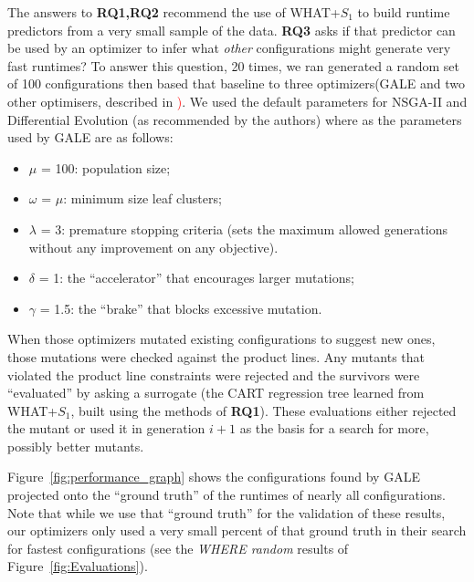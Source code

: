 \documentclass{sig-alternative}
\newcommand{\fig}[1]{Figure~\ref{fig:#1}}
\begin{document}
The answers to {\bf RQ1,RQ2} recommend the use of WHAT+$S_1$ to build runtime predictors from a very small sample
of the data. {\bf RQ3}
asks if that predictor can be used by an optimizer to infer what {\em other} configurations might generate very fast runtimes?
To answer this question, 20 times, we ran generated a random set of 100 configurations then based that baseline to three optimizers(GALE and two other optimisers,  described in \textcolor{red}{)}.
We used the default parameters for NSGA-II and Differential Evolution (as recommended by the authors) where as the parameters used by GALE are as follows:
\begin{itemize}
\item $\mu$ = 100: population size;
\item $\omega$ = $\mu$: minimum size leaf clusters;
\item $\lambda$ = 3: premature stopping criteria (sets the maximum
allowed generations without any improvement
on any objective).
\item $\delta$ = 1: the ``accelerator'' that encourages larger
mutations;
\item $\gamma$ = 1.5: the ``brake'' that blocks excessive mutation.
\end{itemize}

When those optimizers mutated existing configurations to suggest new ones,
those mutations were checked against the product lines. Any mutants that violated the product line constraints were rejected
and the survivors were ``evaluated'' by asking a surrogate
(the  CART regression tree learned from WHAT+$S_1$, built using the methods of {\bf RQ1}).
These evaluations either rejected the mutant or used it in generation $i+1$ as the basis for a search for more, possibly
better  mutants.

\fig{performance_graph} shows the configurations found by GALE projected onto the ``ground truth'' of the runtimes of nearly
all configurations. Note that while we use that ``ground truth'' for the validation of these results, our optimizers only
used a very small percent of that ground truth in their search for fastest configurations (see the {\em WHERE random}
results of \fig{Evaluations}).
\end{document}
